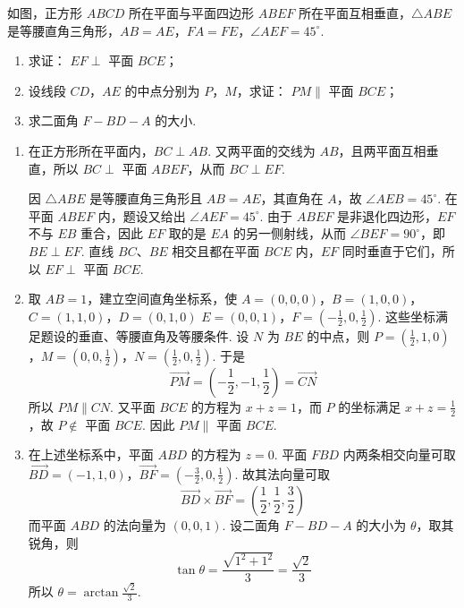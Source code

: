 \begin{problem}
如图，正方形 \(ABCD\) 所在平面与平面四边形 \(ABEF\) 所在平面互相垂直，\(\triangle ABE\) 是等腰直角三角形，\(AB = AE\)，\(FA = FE\)，\(\angle AEF = 45^{\circ}\).

\begin{enumerate}
\item 求证： \(EF \perp\) 平面 \(BCE\)；
\item 设线段 \(CD\)，\(AE\) 的中点分别为 \(P\)，\(M\)，求证： \(PM \parallel\) 平面 \(BCE\)；
\item 求二面角 \(F - BD - A\) 的大小.
\end{enumerate}

\begin{solution}
\begin{enumerate}
\item 在正方形所在平面内，\(BC\perp AB\). 又两平面的交线为 \(AB\)，且两平面互相垂直，所以
\(BC\perp\) 平面 \(ABEF\)，从而 \(BC\perp EF\).

因 \(\triangle ABE\) 是等腰直角三角形且 \(AB=AE\)，其直角在 \(A\)，故
\(\angle AEB=45^{\circ}\). 在平面 \(ABEF\) 内，题设又给出
\(\angle AEF=45^{\circ}\). 由于 \(ABEF\) 是非退化四边形，\(EF\) 不与 \(EB\)
重合，因此 \(EF\) 取的是 \(EA\) 的另一侧射线，从而
\(\angle BEF=90^{\circ}\)，即 \(BE\perp EF\). 直线 \(BC\)、\(BE\) 相交且都在平面 \(BCE\) 内，\(EF\) 同时垂直于它们，所以
\(EF\perp\) 平面 \(BCE\).

\item 取 \(AB=1\)，建立空间直角坐标系，使
\(A=(0,0,0)\)，\(B=(1,0,0)\)，\(C=(1,1,0)\)，\(D=(0,1,0)\)
\(E=(0,0,1)\)，\(F=\left(-\frac12,0,\frac12\right)\).
这些坐标满足题设的垂直、等腰直角及等腰条件. 设 \(N\) 为 \(BE\) 的中点，则
\(P=\left(\frac12,1,0\right)\)，\(M=\left(0,0,\frac12\right)\)，\(N=\left(\frac12,0,\frac12\right)\).
于是
\[
\overrightarrow{PM}=\left(-\frac12,-1,\frac12\right)
=\overrightarrow{CN}
\]
所以 \(PM\parallel CN\). 又平面 \(BCE\) 的方程为 \(x+z=1\)，而
\(P\) 的坐标满足 \(x+z=\frac12\)，故 \(P\notin\) 平面 \(BCE\). 因此
\(PM\parallel\) 平面 \(BCE\).

\item 在上述坐标系中，平面 \(ABD\) 的方程为 \(z=0\). 平面 \(FBD\) 内两条相交向量可取
\(\overrightarrow{BD}=(-1,1,0)\)，\(\overrightarrow{BF}=\left(-\frac32,0,\frac12\right)\).
故其法向量可取
\[
\overrightarrow{BD}\times\overrightarrow{BF}=\left(\frac12,\frac12,\frac32\right)
\]
而平面 \(ABD\) 的法向量为 \((0,0,1)\). 设二面角 \(F-BD-A\) 的大小为 \(\theta\)，取其锐角，则
\[
\tan\theta=\frac{\sqrt{1^2+1^2}}{3}=\frac{\sqrt2}{3}
\]
所以 \(\theta=\arctan\frac{\sqrt2}{3}\).
\end{enumerate}
\end{solution}
\end{problem}

